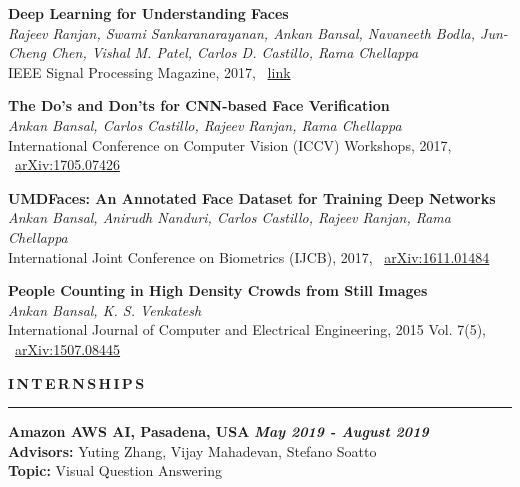 \documentclass[11pt, a4paper]{article}
\begin{document}
\vspace{3pt}

\textbf{Deep Learning for Understanding Faces} \\
\textit{Rajeev Ranjan, Swami Sankaranarayanan, Ankan Bansal, Navaneeth Bodla, Jun-Cheng Chen, Vishal
M. Patel,  Carlos D. Castillo, Rama Chellappa}\\
IEEE Signal Processing Magazine, 2017, ~\href{https://ieeexplore.ieee.org/abstract/document/8253595}{link}

\vspace{3pt}

\textbf{The Do's and Don'ts for CNN-based Face Verification} \\
\textit{Ankan Bansal, Carlos Castillo, Rajeev Ranjan, Rama Chellappa}\\
International Conference on Computer Vision (ICCV) Workshops, 2017, ~\href{https://arxiv.org/abs/1705.07426}{arXiv:1705.07426}

\vspace{3pt}

\textbf{UMDFaces: An Annotated Face Dataset for Training Deep Networks} \\
\textit{Ankan Bansal, Anirudh Nanduri, Carlos Castillo, Rajeev Ranjan, Rama Chellappa}\\
International Joint Conference on Biometrics (IJCB), 2017, ~\href{https://arxiv.org/abs/1611.01484}{arXiv:1611.01484}

\vspace{3pt}

\textbf{People Counting in High Density Crowds from Still Images} \\
\textit{Ankan Bansal, K. S. Venkatesh}\\
International Journal of Computer and Electrical Engineering, 2015 Vol. 7(5), ~\href{https://arxiv.org/abs/1507.08445}{arXiv:1507.08445}

\vspace{8pt}

\textbf{I\,N\,T\,E\,R\,N\,S\,H\,I\,P\,S}
\vspace{5pt}
\hrule
\vspace{7pt}
\textbf{Amazon AWS AI, Pasadena, USA} \hfill \textit{\textbf{May 2019 - August 2019}} \\
\textbf{Advisors: }Yuting Zhang, Vijay Mahadevan, Stefano Soatto \\
\textbf{Topic: }Visual Question Answering

\vspace{4pt}
\end{document}
